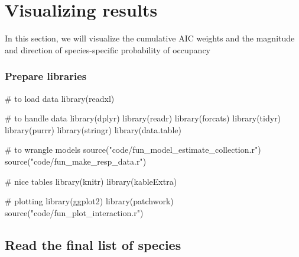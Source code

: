 \documentclass[]{article}
\newenvironment{Shaded}{}{}
\newcommand{\CommentTok}[1]{\textcolor[rgb]{0.00,0.50,0.00}{#1}}
\newcommand{\KeywordTok}[1]{\textcolor[rgb]{0.00,0.00,1.00}{#1}}
\newcommand{\NormalTok}[1]{#1}
\newcommand{\OperatorTok}[1]{#1}
\newcommand{\StringTok}[1]{\textcolor[rgb]{0.00,0.50,0.50}{#1}}
\begin{document}
\hypertarget{visualizing-results}{%
\section{Visualizing results}\label{visualizing-results}}

In this section, we will visualize the cumulative AIC weights and the magnitude and direction of species-specific probability of occupancy

\hypertarget{prepare-libraries-3}{%
\subsubsection{Prepare libraries}\label{prepare-libraries-3}}

\begin{Shaded}
\begin{Highlighting}[]
\CommentTok{# to load data}
\KeywordTok{library}\NormalTok{(readxl)}

\CommentTok{# to handle data}
\KeywordTok{library}\NormalTok{(dplyr)}
\KeywordTok{library}\NormalTok{(readr)}
\KeywordTok{library}\NormalTok{(forcats)}
\KeywordTok{library}\NormalTok{(tidyr)}
\KeywordTok{library}\NormalTok{(purrr)}
\KeywordTok{library}\NormalTok{(stringr)}
\KeywordTok{library}\NormalTok{(data.table)}

\CommentTok{# to wrangle models}
\KeywordTok{source}\NormalTok{(}\StringTok{"code/fun_model_estimate_collection.r"}\NormalTok{)}
\KeywordTok{source}\NormalTok{(}\StringTok{"code/fun_make_resp_data.r"}\NormalTok{)}

\CommentTok{# nice tables}
\KeywordTok{library}\NormalTok{(knitr)}
\KeywordTok{library}\NormalTok{(kableExtra)}

\CommentTok{# plotting}
\KeywordTok{library}\NormalTok{(ggplot2)}
\KeywordTok{library}\NormalTok{(patchwork)}
\KeywordTok{source}\NormalTok{(}\StringTok{"code/fun_plot_interaction.r"}\NormalTok{)}
\end{Highlighting}
\end{Shaded}

\hypertarget{read-the-final-list-of-species}{%
\subsection{Read the final list of species}\label{read-the-final-list-of-species}}

\begin{Shaded}
\end{Shaded}
\end{document}
